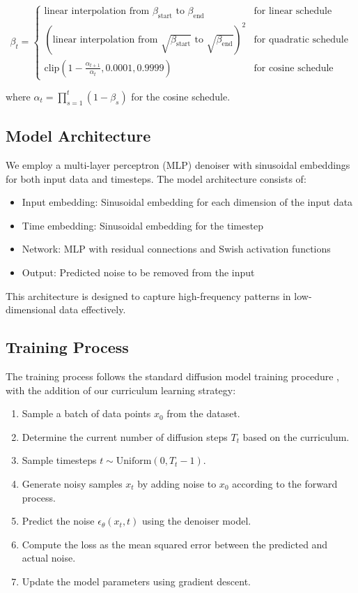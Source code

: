 \documentclass{article} %
\begin{document}
\begin{equation}
    \beta_t = \begin{cases}
        \text{linear interpolation from } \beta_{\text{start}} \text{ to } \beta_{\text{end}} & \text{for linear schedule} \\
        (\text{linear interpolation from } \sqrt{\beta_{\text{start}}} \text{ to } \sqrt{\beta_{\text{end}}})^{2} & \text{for quadratic schedule} \\
        \text{clip}(1 - \frac{\alpha_{t+1}}{\alpha_t}, 0.0001, 0.9999) & \text{for cosine schedule}
    \end{cases}
\end{equation}

where $\alpha_t = \prod_{s=1}^t (1 - \beta_s)$ for the cosine schedule.

\subsection{Model Architecture}
We employ a multi-layer perceptron (MLP) denoiser with sinusoidal embeddings for both input data and timesteps. The model architecture consists of:

\begin{itemize}
    \item Input embedding: Sinusoidal embedding for each dimension of the input data
    \item Time embedding: Sinusoidal embedding for the timestep
    \item Network: MLP with residual connections and Swish activation functions
    \item Output: Predicted noise to be removed from the input
\end{itemize}

This architecture is designed to capture high-frequency patterns in low-dimensional data effectively.

\subsection{Training Process}
The training process follows the standard diffusion model training procedure \citep{ddpm}, with the addition of our curriculum learning strategy:

\begin{enumerate}
    \item Sample a batch of data points $x_0$ from the dataset.
    \item Determine the current number of diffusion steps $T_t$ based on the curriculum.
    \item Sample timesteps $t \sim \text{Uniform}(0, T_t - 1)$.
    \item Generate noisy samples $x_t$ by adding noise to $x_0$ according to the forward process.
    \item Predict the noise $\epsilon_\theta(x_t, t)$ using the denoiser model.
    \item Compute the loss as the mean squared error between the predicted and actual noise.
    \item Update the model parameters using gradient descent.
\end{enumerate}
\end{document}
